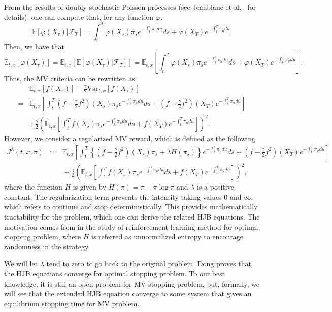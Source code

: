 \documentclass[11pt]{article}
\begin{document}
From the results of doubly stochastic Poisson processes (see Jeanblanc et al.~\cite{jeanblanc2009mathematical} for details), one can compute that, for any function $\varphi$,
$$
\mathbb E \left[ \varphi(X_\tau) |\mathcal F_T\right]=\int_t^T \varphi(X_s)\pi_s e^{-\int_t^s \pi_u du}ds+\varphi(X_T)e^{-\int_t^T \pi_udu}.
$$
Then, we have that 
$$
\mathbb E_{t,x}[\varphi(X_\tau)]=\mathbb E_{t,x}[\mathbb E[\varphi(X_\tau)|\mathcal F_T]]=\mathbb E_{t,x}\left[\int_t^T \varphi(X_s)\pi_s e^{-\int_t^s \pi_u du}ds+\varphi(X_T)e^{-\int_t^T \pi_udu}\right].
$$
Thus, the  MV criteria can be rewritten as 
\begin{equation*}
\begin{split}
&\mathbb E_{t,x}\left[f(X_\tau)\right]-\frac{\gamma}{2}\text{Var}_{t,x}\left[f(X_\tau)\right]\\
=&\mathbb E_{t,x}\left[\int_t^T (f-\frac{\gamma}{2}f^2)(X_s)\pi_s e^{-\int_t^s \pi_u du}ds+(f-\frac{\gamma}{2}f^2)(X_T)e^{-\int_t^T \pi_u du}\right]\\
&+\frac{\gamma}{2}\left(\mathbb E_{t,x}\left[\int_t^T f(X_s)\pi_s e^{-\int_t^s \pi_u du}ds+f(X_T)e^{-\int_t^T \pi_u du}\right]\right)^2.
\end{split}
\end{equation*}
However, we consider a regularized   MV  reward, which is defined as the following
\begin{eqnarray}
			J^{\lambda}(t,x;\pi)&:=&\mathbb E_{t,x}\left[\int_t^T\left\{  (f-\frac{\gamma}{2}f^2)(X_s)\pi_s+\lambda H(\pi_s)\right\}e^{-\int_t^s \pi_udu}ds+(f-\frac{\gamma}{2}f^2)(X_T)e^{-\int_t^T \pi_udu}\right] \nonumber\\
		&&{}+\frac{\gamma}{2}\left(\mathbb E_{t,x}\left[ \int_t^T f(X_s)\pi_s e^{-\int_t^s \pi_udu}ds+f(X_T)e^{-\int_t^T \pi_udu}\right] \right)^2 \label{J^lambda},
	\end{eqnarray}
where the function $H$ is given by   $H(\pi)=\pi-\pi\log\pi$ and $\lambda$ is a positive constant.
The regularization term prevents the intensity taking values $0$ and $\infty$, which refers to continue and stop deterministically.  This provides mathematically tractability for the problem, which one can derive the related HJB equations.  The motivation comes from \cite{dong2024randomized} in the study of reinforcement learning method for optimal stopping problem, where $H$ is referred as unnormalized entropy to encourage randomness in the strategy.  

We  will let $\lambda$ tend to zero to go back to the original problem. Dong \cite{dong2024randomized} proves that the HJB equations  converge for optimal stopping problem. To our best knowledge, it is still an open problem for MV stopping problem, but, formally, we will see that the extended HJB equation converge to some  system that gives an equilibrium stopping time  for MV problem.  
\end{document}
